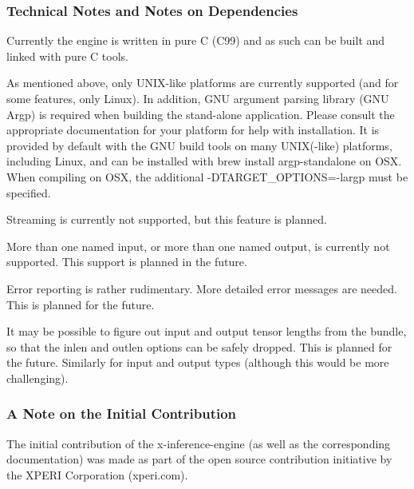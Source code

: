 \subsubsection*{Technical Notes and Notes on Dependencies}


\begin{DoxyEnumerate}
\item Currently the engine is written in pure C (C99) and as such can be built and linked with pure C tools.
\item As mentioned above, only U\+N\+I\+X-\/like platforms are currently supported (and for some features, only Linux). In addition, G\+NU argument parsing library (G\+NU Argp) is required when building the stand-\/alone application. Please consult the appropriate documentation for your platform for help with installation. It is provided by default with the G\+NU build tools on many U\+N\+IX(-\/like) platforms, including Linux, and can be installed with {\ttfamily brew install argp-\/standalone} on O\+SX. When compiling on O\+SX, the additional {\ttfamily -\/\+D\+T\+A\+R\+G\+E\+T\+\_\+\+O\+P\+T\+I\+O\+NS=-\/largp} must be specified.
\item Streaming is currently not supported, but this feature is planned.
\item More than one named input, or more than one named output, is currently not supported. This support is planned in the future.
\item Error reporting is rather rudimentary. More detailed error messages are needed. This is planned for the future.
\item It may be possible to figure out input and output tensor lengths from the bundle, so that the {\ttfamily inlen} and {\ttfamily outlen} options can be safely dropped. This is planned for the future. Similarly for input and output types (although this would be more challenging).
\end{DoxyEnumerate}

\subsubsection*{A Note on the Initial Contribution}

The initial contribution of the {\ttfamily x-\/inference-\/engine} (as well as the corresponding documentation) was made as part of the open source contribution initiative by the X\+P\+E\+RI Corporation (xperi.\+com). 
